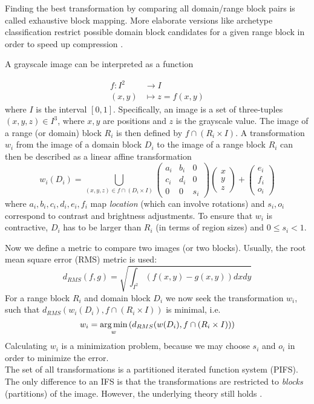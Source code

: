 Finding the best transformation by comparing all domain/range block pairs is
called exhaustive block mapping. More elaborate versions like archetype
classification restrict possible domain block candidates for a given range block
in order to speed up compression \cite{jacobs1992image}.

 A grayscale image can be interpreted as a function

\begin{align*}
    f \colon I^2 &\to I\\
    (x,y) &\mapsto z = f(x,y)
\end{align*}
where $I$ is the interval $[0,1]$. Specifically, an image is a set of three-tuples $(x,y,z) \in I^3$, where $x,y$ are positions and $z$ is the grayscale value.
The image of a range (or domain) block $R_i$ is then defined by $f \cap (R_i \times I)$.
A transformation $w_i$ from the image of a domain block $D_i$ to the image of a range block $R_i$ can then be described as a linear affine transformation
$$
w_i(D_i) = \bigcup_{(x,y,z) \in f \cap (D_i \times I)} \begin{pmatrix} a_i & b_i & 0 \\ c_i & d_i & 0 \\ 0 & 0 & s_i \end{pmatrix} \begin{pmatrix} x\\y\\z \end{pmatrix} + \begin{pmatrix} e_i\\f_i\\o_i \end{pmatrix}
$$
where $a_i, b_i, c_i, d_i, e_i, f_i$ map \textit{location} (which can involve rotations) and $s_i, o_i$ correspond to contrast and brightness adjustments.
To ensure that $w_i$ is contractive, $D_i$ has to be larger than $R_i$ (in terms of region sizes) and $0 \leq s_i < 1$.

Now we define a metric to compare two images (or two blocks). Usually, the root mean square error (RMS) metric is used:
$$
d_{RMS}(f,g) = \sqrt{\int_{I^2} (f(x,y)-g(x,y))dxdy}
$$
For a range block $R_i$ and domain block $D_i$ we now seek the transformation $w_i$, such that $d_{RMS}(w_i(D_i), f \cap (R_i \times I))$ is minimal, i.e.
\begin{equation} \label{eq:min-problem}
    w_i = \operatorname*{arg\,min}_{w} \left( d_{RMS}(w(D_i), f \cap (R_i \times I)) \right)
\end{equation}
Calculating $w_i$ is a minimization problem, because we may choose $s_i$ and $o_i$ in order to minimize the error.\\
The set of all transformations is a partitioned iterated function system (PIFS). The only difference to an IFS is that the transformations are restricted
to \textit{blocks} (partitions) of the image. However, the underlying theory still holds \cite{fisher2012}.

